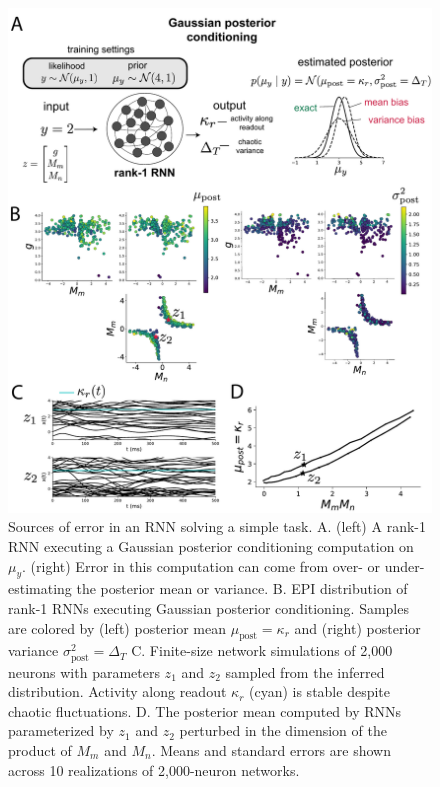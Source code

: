 \documentclass[11pt]{article}
\begin{document}
\begin{figure}
\begin{center}
\includegraphics[scale=0.7]{figures/fig5/fig5.pdf}
\end{center}
\caption{Sources of error in an RNN solving a simple task.  A. (left) A rank-1 RNN executing a Gaussian posterior conditioning computation on $\mu_y$. (right) Error in this computation can come from over- or under-estimating the posterior mean or variance. B. EPI distribution of rank-1 RNNs executing Gaussian posterior conditioning.  Samples are colored by (left) posterior mean $\mu_{\text{post}}=\kappa_r$ and (right) posterior variance $\sigma^2_{\text{post}}=\Delta_T$  C.  Finite-size network simulations of 2,000 neurons with parameters $z_1$ and $z_2$ sampled from the inferred distribution.  Activity along readout $\kappa_r$ (cyan) is stable despite chaotic fluctuations.  D. The posterior mean computed by RNNs parameterized by $z_1$ and $z_2$ perturbed in the dimension of the product of $M_m$ and $M_n$.  Means and standard errors are shown across 10 realizations of 2,000-neuron networks.}
\label{fig:RNN}
\end{figure}
\end{document}
